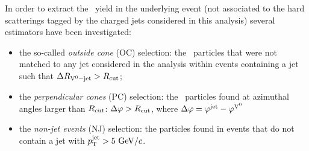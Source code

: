 




In order to extract the \Vzero\ yield in the underlying event (not associated to the hard scatterings tagged by the charged jets considered in this analysis) several estimators have been investigated:
\begin{itemize}
  \item the so-called {\it outside cone} (OC) selection: the \Vzero\ particles that were not matched to any jet considered in the analysis within events containing a jet such that $\Delta R_{{\rm V}^{0}-{\rm jet}} > R_{\rm cut}$;
  \item the {\it perpendicular cones} (PC) selection: the \Vzero\ particles found at azimuthal angles larger than $R_{\rm cut}$: $\Delta \varphi > R_{\rm cut}$, where $\Delta \varphi= \varphi^{\rm jet} - \varphi^{{\rm V}^{0}}$  %
  \item the {\it non-jet events } (NJ) selection: the \Vzero particles found in events that do not contain a jet with $p_{\mathrm{T}}^{\mathrm{jet}}>5~\mathrm{GeV}/c$.
\end{itemize}

